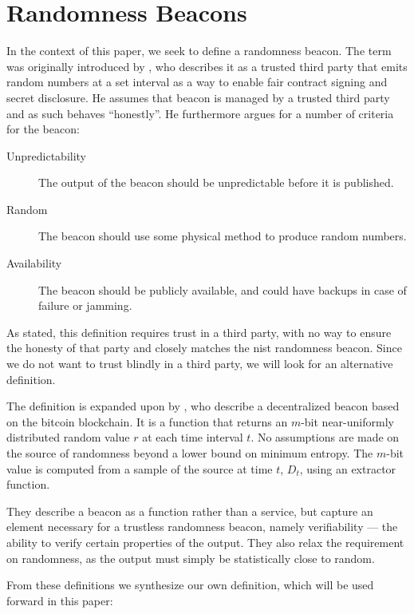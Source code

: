 \section{Randomness Beacons}\label{sec:beacons}

In the context of this paper, we seek to define a randomness beacon.
The term was originally introduced by \citet{rabin1983transaction}, who describes it as a trusted third party that emits random numbers at a set interval as a way to enable fair contract signing and secret disclosure.
He assumes that beacon is managed by a trusted third party and as such behaves \enquote{honestly}. He furthermore argues for a number of criteria for the beacon:

\begin{description}
    \item[Unpredictability] The output of the beacon should be unpredictable before it is published.
    \item[Random] The beacon should use some physical method to produce random numbers.
    \item[Availability] The beacon should be publicly available, and could have backups in case of failure or jamming.
\end{description}

As stated, this definition requires trust in a third party, with no way to ensure the honesty of that party and closely matches the \gls{nist} randomness beacon.
Since we do not want to trust blindly in a third party, we will look for an alternative definition.

The definition is expanded upon by \citet{bonneau2015bitcoin}, who describe a decentralized beacon based on the bitcoin blockchain.
It is a function that returns an $m$-bit near-uniformly distributed random value $r$ at each time interval $t$.
No assumptions are made on the source of randomness beyond a lower bound on minimum entropy.
The $m$-bit value is computed from a sample of the source at time $t$, $D_t$, using an extractor function.

They describe a beacon as a function rather than a service, but capture an element necessary for a trustless randomness beacon, namely verifiability --- the ability to verify certain properties of the output.
They also relax the requirement on randomness, as the output must simply be statistically close to random.

From these definitions we synthesize our own definition, which will be used forward in this paper:

